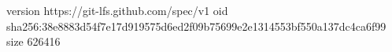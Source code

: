 version https://git-lfs.github.com/spec/v1
oid sha256:38e8883d54f7e17d919575d6ed2f09b75699e2e1314553bf550a137dc4ca6f99
size 626416
